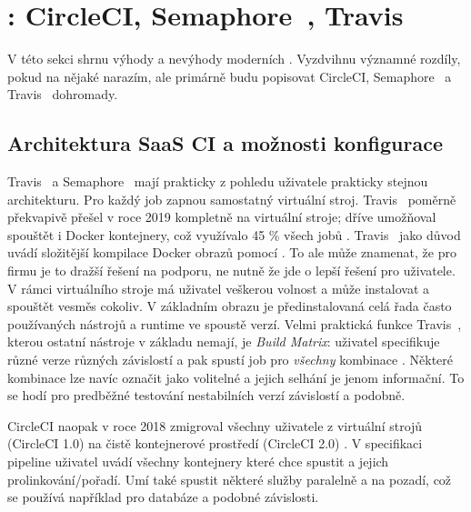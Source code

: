\newcommand{\circleci}{\xspace{}CircleCI\xspace}
\newcommand{\travis}{\xspace{}Travis~\glstext{CI}\xspace}
\newcommand{\semaphore}{\xspace{}Semaphore~\xspace}

\section{: \circleci, \semaphore, \travis}
    V této sekci shrnu výhody a nevýhody moderních  \CI. Vyzdvihnu významné rozdíly, pokud na nějaké narazím, ale primárně budu popisovat \circleci, \semaphore a \travis dohromady.

    \subsection{Architektura SaaS CI a možnosti konfigurace}
        \travis a \semaphore mají prakticky z pohledu uživatele prakticky stejnou architekturu. Pro každý job zapnou samostatný virtuální stroj. \travis poměrně překvapivě přešel v roce 2019 kompletně na virtuální stroje; dříve umožňoval spouštět i Docker kontejnery, což využívalo 45 \% všech jobů \cite{travis-arch}. \travis jako důvod uvádí složitější kompilace Docker obrazů pomocí . To ale může znamenat, že pro firmu je to dražší řešení na podporu, ne nutně že jde o lepší řešení pro uživatele. V rámci virtuálního stroje má uživatel veškerou volnost a může instalovat a spouštět vesměs cokoliv. V základním obrazu je předinstalovaná celá řada často používaných nástrojů a runtime ve spoustě verzí. Velmi praktická funkce \travis, kterou ostatní \CI nástroje v základu nemají, je \textit{Build Matrix}: uživatel specifikuje různé verze různých závislostí a \CI pak spustí job pro \textit{všechny} kombinace \cite{travis-build-matrix}. Některé kombinace lze navíc označit jako volitelné a jejich selhání je jenom informační. To se hodí pro predběžné testování nestabilních  verzí závislostí a podobně.

        \circleci naopak v roce 2018 zmigroval všechny uživatele z virtuální strojů (\circleci 1.0) na čistě kontejnerové prostředí (\circleci 2.0) \cite{circle-migration}. V specifikaci pipeline uživatel uvádí všechny kontejnery které chce spustit a jejich prolinkování/pořadí. Umí také spustit některé služby paralelně a na pozadí, což se používá například pro databáze a podobné závislosti.

